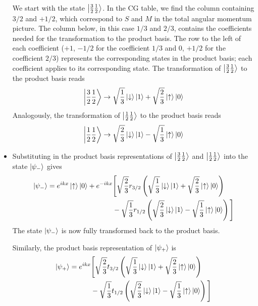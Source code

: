 \documentclass[11pt, a4paper]{article}
\newcommand{\ua}{\uparrow}  %
\newcommand{\da}{\downarrow}  %
\begin{document}
\begin{itemize}
	We start with the state $ \ket{\frac{3}{2}\frac{1}{2}} $. In the CG table, we find the column containing $ 3/2 $ and $ +1/2 $, which correspond to $ S $ and $ M $ in the total angular momentum picture. The column below, in this case $ 1/3 $ and $ 2/3 $, contains the coefficients needed for the transformation to the product basis. The row to the left of each coefficient ($ +1 $, $ -1/2 $ for the coefficient $ 1/3 $ and $ 0 $, $ +1/2 $ for the coefficient $ 2/3 $) represents the corresponding states in the product basis; each coefficient applies to its corresponding state. The transformation of $ \ket{\frac{3}{2}\frac{1}{2}} $ to the product basis reads
	\begin{equation*}
		\ket{\frac{3}{2}\frac{1}{2}}  \to \sqrt{\frac{1}{3}}\ket{\da}\ket{1} +  \sqrt{\frac{2}{3}}\ket{\ua}\ket{0} 
	\end{equation*}
	Analogously, the transformation of $ \ket{\frac{1}{2}\frac{1}{2}} $ to the product basis reads
	\begin{equation*}
		\ket{\frac{1}{2}\frac{1}{2}}  \to \sqrt{\frac{2}{3}}\ket{\da}\ket{1} - \sqrt{\frac{1}{3}}\ket{\ua}\ket{0} 
	\end{equation*}
	
	\item Substituting in the product basis representations of $ \ket{\frac{3}{2}\frac{1}{2}} $ and $ \ket{\frac{1}{2}\frac{1}{2}} $ into the state $ \ket{\psi_{-}} $ gives
	\begin{align*}
		\ket{\psi_{-}} = e^{ikx}\ket{\ua}\ket{0} + e^{-ikx} & \Bigg[\sqrt{\frac{2}{3}}r_{3/2}\left(\sqrt{\frac{1}{3}}\ket{\da}\ket{1} +  \sqrt{\frac{2}{3}}\ket{\ua}\ket{0}\right) \\
		& - \sqrt{\frac{1}{3}}r_{1/2}\left( \sqrt{\frac{2}{3}}\ket{\da}\ket{1} - \sqrt{\frac{1}{3}}\ket{\ua}\ket{0} \right)\Bigg]
	\end{align*}
	The state $ \ket{\psi_{-}}  $ is now fully transformed back to the product basis. 
	
	Similarly, the product basis representation of $ \ket{\psi_{+}} $ is
	\begin{align*}
		\ket{\psi_{+}} =  e^{ikx}& \Bigg[\sqrt{\frac{2}{3}}t_{3/2}\left(\sqrt{\frac{1}{3}}\ket{\da}\ket{1} +  \sqrt{\frac{2}{3}}\ket{\ua}\ket{0}\right) \\
		&- \sqrt{\frac{1}{3}}t_{1/2}\left( \sqrt{\frac{2}{3}}\ket{\da}\ket{1} - \sqrt{\frac{1}{3}}\ket{\ua}\ket{0} \right)\Bigg]
	\end{align*}
	

\end{itemize}
\end{document}
